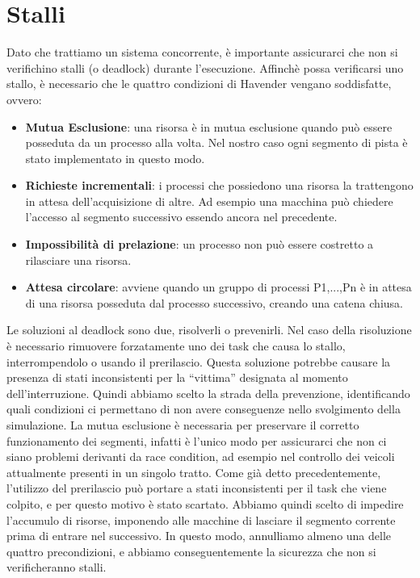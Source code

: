 \section{Stalli}
Dato che trattiamo un sistema concorrente, è importante assicurarci che non si verifichino stalli (o deadlock) durante l’esecuzione.
Affinchè possa verificarsi uno stallo, è necessario che le quattro condizioni di Havender vengano soddisfatte, ovvero:
\begin{itemize}
 \item \textbf{Mutua Esclusione}: una risorsa è in mutua esclusione quando può essere posseduta da un processo alla volta. Nel nostro caso ogni segmento di pista è stato implementato in questo modo.
 \item \textbf{Richieste incrementali}: i processi che possiedono una risorsa la trattengono in attesa dell’acquisizione di altre. Ad esempio una macchina può chiedere l’accesso al segmento successivo essendo ancora nel precedente.
 \item \textbf{Impossibilità di prelazione}: un processo non può essere costretto a rilasciare una risorsa.
 \item \textbf{Attesa circolare}: avviene quando un gruppo di processi P1,...,Pn è in attesa di una risorsa posseduta dal processo successivo, creando una catena chiusa.
\end{itemize}
Le soluzioni al deadlock sono due, risolverli o prevenirli. Nel caso della risoluzione è necessario rimuovere forzatamente uno dei task che causa lo stallo, interrompendolo o usando il prerilascio. Questa soluzione potrebbe causare la presenza di stati inconsistenti per la “vittima” designata al momento dell’interruzione. 
Quindi abbiamo scelto la strada della prevenzione, identificando quali condizioni ci permettano di non avere conseguenze nello svolgimento della simulazione.
La mutua esclusione è necessaria per preservare il corretto funzionamento dei segmenti, infatti è l’unico modo per assicurarci che non ci siano problemi derivanti da race condition, ad esempio nel controllo dei veicoli attualmente presenti in un singolo tratto.
Come già detto precedentemente, l’utilizzo del prerilascio può portare a stati inconsistenti per il task che viene colpito, e per questo motivo è stato scartato.
Abbiamo quindi scelto di impedire l’accumulo di risorse, imponendo alle macchine di lasciare il segmento corrente prima di entrare nel successivo. In questo modo, annulliamo almeno una delle quattro precondizioni, e abbiamo conseguentemente la sicurezza che non si verificheranno stalli.

